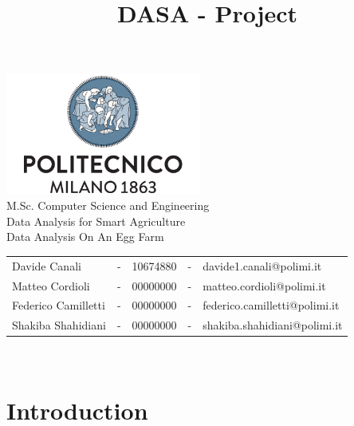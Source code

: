 \documentclass[11pt]{article}
\title{DASA - Project}
\begin{document}
\setlength{\parskip}{1em}

\begin{titlepage}
\centering
\vfill
{
\includegraphics[width =\linewidth, height = 4cm, keepaspectratio]{PolitecnicoLogo.png}
\label{fig:PolitecnicoLogo}
\large \\[2ex]M.Sc. Computer Science and Engineering\\
\large Data Analysis for Smart Agriculture\\[12ex]
\huge
Data Analysis On An Egg Farm\\[1.5ex]
\large
\vspace{10mm}

\vspace{15mm}
\normalsize

\vspace{30mm}

\begin{tabular}{lclcl}
    Davide Canali & - & 10674880 & - & davide1.canali@polimi.it\\
    Matteo Cordioli & - & 00000000 & - & matteo.cordioli@polimi.it\\
    Federico Camilletti & - & 00000000 & - & federico.camilletti@polimi.it\\
    Shakiba Shahidiani  & - & 00000000 & - & shakiba.shahidiani@polimi.it\\
\end{tabular}

\vspace{30mm}

\@date\\[2.5ex]
}
\end{titlepage}

\makeatother
\tableofcontents
\newpage

\section{Introduction}
\end{document}
